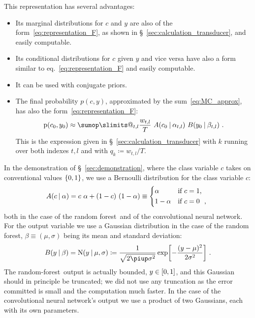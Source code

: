 \documentclass[a4paper,12pt,%
onecolumn,oneside,article,%
british%
]{memoir}
\makeatletter
\def\sum{\DOTSI\sumop\slimits@}
\newcommand*{\pu}{\piup}%
\newcommand*{\defd}{\coloneqq}
\DeclarePairedDelimiter\clcl{[}{]}
\DeclarePairedDelimiter\set{\{}{\}} %
\newcommand*{\p}{\mathrm{p}}%
\renewcommand*{\|}[1][]{\nonscript\:#1\vert\nonscript\:\mathopen{}}
\newcommand*{\sect}{\S}%
\newcommand*{\eqn}{eq.}%
\newcommand*{\RF}{random forest}
\newcommand*{\rf}{random-forest}
\newcommand*{\CNN}{convolutional neural network}
\newcommand*{\No}{\mathrm{N}}
\makeatother
\begin{document}
This representation \autocites[promoted by][]{dunsonetal2011}[see also][]{rasmussen1999} has several advantages:
\begin{itemize}
\item Its marginal distributions for $c$ and $y$ are also of the form~\eqref{eq:representation_F}, as shown in \sect~\ref{sec:calculation_transducer}, and easily computable.
\item Its conditional distributions for $c$ given $y$ and vice versa have also a form similar to \eqn~\eqref{eq:representation_F} and easily computable.
\item It can be used with conjugate priors.
\item The final probability $p(c,y)$, approximated by the sum~\eqref{eq:MC_approx}, has also the form~\eqref{eq:representation_F}:
  \begin{equation}
    \label{eq:sum_of_sums_for_prob}
    \p(c_{0}, y_{0}) \approx
    \sum_{t,l} \frac{w_{t,l}}{T}
    \ A(c_{0} \| \alpha_{t,l})\ B(y_{0} \| \beta_{t,l}) \ .
  \end{equation}
This is the expression given in \sect~\ref{sec:calculation_transducer} with $k$ running over both indexes $t,l$ and with $q_{k} \defd w_{t,l}/T$.
\end{itemize}

In the demonstration of \sect~\ref{sec:demonstration}, where the class variable $c$ takes on conventional values $\set{0,1}$, we use a Bernoulli distribution for the class variable $c$:
\begin{equation}
  \label{eq:distr_class}
  A(c \| \alpha) = c\ \alpha + (1-c)\ (1-\alpha) \equiv
  \begin{dcases*}
    \alpha& if $c=1$, \\ 1-\alpha & if $c=0$ \ ,
  \end{dcases*}
\end{equation}
both in the case of the \RF\ and of the \CNN. For the output variable we use
a Gaussian distribution in the case of the \RF, $\beta \equiv (\mu,\sigma)$ being its mean and standard deviation:
\begin{equation}
  \label{eq:distr_output}
  B(y \| \beta) = \No(y \| \mu, \sigma) \defd \frac{1}{\sqrt{2\pu\sigma^{2}}} \exp\biggl[-\frac{(y-\mu)^{2}}{2\sigma^{2}}\biggr] \ .
\end{equation}
The \rf\ output is actually bounded, $y\in \clcl{0,1}$, and this Gaussian should in principle be truncated; we did not use any truncation as the error committed is small and the computation much faster. In the case of the  \CNN's output we use a product of two Gaussians, each with its own parameters.
\end{document}
